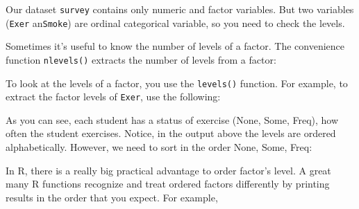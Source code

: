 \documentclass[
]{book}
\newenvironment{Shaded}{\begin{snugshade}}{\end{snugshade}}
\newcommand{\AttributeTok}[1]{\textcolor[rgb]{0.77,0.63,0.00}{#1}}
\newcommand{\CommentTok}[1]{\textcolor[rgb]{0.56,0.35,0.01}{\textit{#1}}}
\newcommand{\FunctionTok}[1]{\textcolor[rgb]{0.00,0.00,0.00}{#1}}
\newcommand{\NormalTok}[1]{#1}
\newcommand{\OtherTok}[1]{\textcolor[rgb]{0.56,0.35,0.01}{#1}}
\newcommand{\SpecialCharTok}[1]{\textcolor[rgb]{0.00,0.00,0.00}{#1}}
\newcommand{\StringTok}[1]{\textcolor[rgb]{0.31,0.60,0.02}{#1}}
\begin{document}
Our dataset \texttt{survey} contains only numeric and factor variables. But two variables (\texttt{Exer} an\texttt{Smoke}) are ordinal categorical variable, so you need to check the levels.

Sometimes it's useful to know the number of levels of a factor. The convenience function \texttt{nlevels()} extracts the number of levels from a factor:

\begin{Shaded}
\end{Shaded}

To look at the levels of a factor, you use the \texttt{levels()} function. For example,
to extract the factor levels of \texttt{Exer}, use the following:

\begin{Shaded}
\end{Shaded}

As you can see, each student has a status of exercise (None, Some, Freq), how often the student exercises. Notice, in the output above the levels are ordered alphabetically. However, we need to sort in the order None, Some, Freq:

\begin{Shaded}
\end{Shaded}

In R, there is a really big practical advantage to order factor's level. A great
many R functions recognize and treat ordered factors differently by printing results in the order that you expect. For example,
\end{document}
